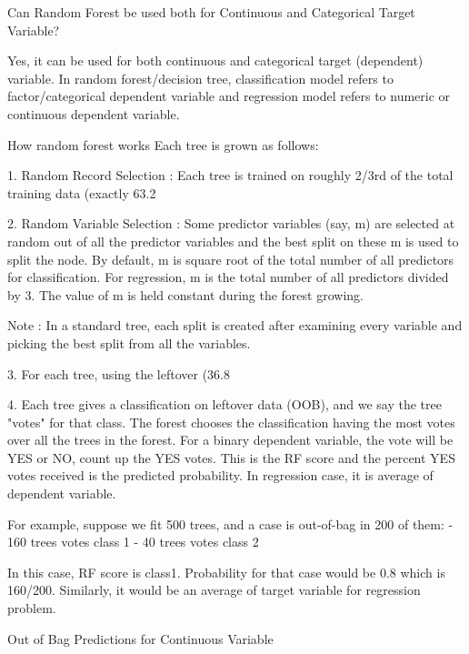 Can Random Forest be used both for Continuous and Categorical Target Variable?

Yes, it can be used for both continuous and categorical target (dependent) variable. In random forest/decision tree, classification model refers to factor/categorical dependent variable and regression model  refers to numeric or continuous dependent variable.

How random forest works
Each tree is grown as follows:

1. Random Record Selection : Each tree is trained on roughly 2/3rd of the total training data (exactly 63.2%

2. Random Variable Selection : Some predictor variables (say, m) are selected at random out of all the predictor variables and the best split on these m is used to split the node.
By default, m is square root of the total number of all predictors for classification. For regression, m is the total number of all predictors divided by 3.
The value of m is held constant during the forest growing.

Note : In a standard tree, each split is created after examining every variable and picking the best split from all the variables.

3. For each tree, using the leftover (36.8%

4. Each tree gives a classification on leftover data (OOB), and we say the tree "votes" for that class. The forest chooses the classification having the most votes over all the trees in the forest. For a binary dependent variable, the vote will be YES or NO, count up the YES votes. This is the RF score and the percent YES votes received is the predicted probability. In regression case, it is average of dependent variable.

For example, suppose we fit 500 trees, and a case is out-of-bag in 200 of them:
 - 160 trees votes class 1
-  40 trees votes class 2

In this case, RF score is class1. Probability for that case would be 0.8 which is 160/200. Similarly, it would be an average of target variable for regression problem.

Out of Bag Predictions for Continuous Variable

